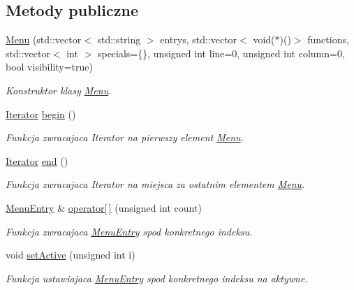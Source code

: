 \subsection*{Metody publiczne}
\begin{DoxyCompactItemize}
\item 
\hyperlink{class_menu_ad705e11e42f40448689344e9028b7dc6}{Menu} (std\+::vector$<$ std\+::string $>$ entrys, std\+::vector$<$ void($\ast$)()$>$ functions, std\+::vector$<$ int $>$ specials=\{\}, unsigned int line=0, unsigned int column=0, bool visibility=true)
\begin{DoxyCompactList}\small\item\em Konstruktor klasy \hyperlink{class_menu}{Menu}. \end{DoxyCompactList}\item 
\hyperlink{class_menu_aceaa934be18280340c221593bbee54d6}{Iterator} \hyperlink{class_menu_ad463178d6970e3db29a3d6289d72c5f0}{begin} ()
\begin{DoxyCompactList}\small\item\em Funkcja zwracajaca Iterator na pierwszy element \hyperlink{class_menu}{Menu}. \end{DoxyCompactList}\item 
\hyperlink{class_menu_aceaa934be18280340c221593bbee54d6}{Iterator} \hyperlink{class_menu_a17613d2e18e1b61105697bf20da2a202}{end} ()
\begin{DoxyCompactList}\small\item\em Funkcja zwracajaca Iterator na miejsca za ostatnim elementem \hyperlink{class_menu}{Menu}. \end{DoxyCompactList}\item 
\hyperlink{class_menu_entry}{Menu\+Entry} \& \hyperlink{class_menu_a4dc775abd74159477e8036f163f654c4}{operator\mbox{[}$\,$\mbox{]}} (unsigned int count)
\begin{DoxyCompactList}\small\item\em Funkcja zwracajaca \hyperlink{class_menu_entry}{Menu\+Entry} spod konkretnego indeksu. \end{DoxyCompactList}\item 
void \hyperlink{class_menu_a823da268994dc5e067f65e6e8101a07b}{set\+Active} (unsigned int i)
\begin{DoxyCompactList}\small\item\em Funkcja ustawiajaca \hyperlink{class_menu_entry}{Menu\+Entry} spod konkretnego indeksu na aktywne. \end{DoxyCompactList}\item 

\end{DoxyCompactItemize}

